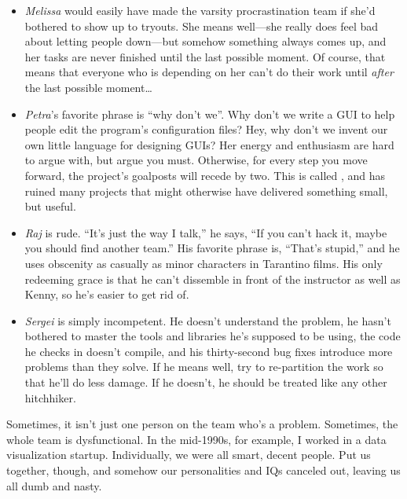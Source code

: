 \documentclass{report}
\begin{document}
\begin{itemize}
  \item \emph{Melissa} would easily have made the varsity
  procrastination team if she'd bothered to show up to tryouts.  She
  means well---she really does feel bad about letting people
  down---but somehow something always comes up, and her tasks are
  never finished until the last possible moment.  Of course, that
  means that everyone who is depending on her can't do their work
  until \emph{after} the last possible moment{\ldots}

  \item \emph{Petra}'s favorite phrase is ``why don't we''.  Why don't
  we write a GUI to help people edit the program's configuration
  files?  Hey, why don't we invent our own little language for
  designing GUIs?  Her energy and enthusiasm are hard to argue with,
  but argue you must.  Otherwise, for every step you move forward, the
  project's goalposts will recede by two.  This is called
  , and has ruined many projects that might
  otherwise have delivered something small, but useful.

  \item \emph{Raj} is rude.  ``It's just the way I talk,'' he says,
  ``If you can't hack it, maybe you should find another team.''  His
  favorite phrase is, ``That's stupid,'' and he uses obscenity as
  casually as minor characters in Tarantino films.  His only redeeming
  grace is that he can't dissemble in front of the instructor as well
  as Kenny, so he's easier to get rid of.

  \item \emph{Sergei} is simply incompetent.  He doesn't understand
  the problem, he hasn't bothered to master the tools and libraries
  he's supposed to be using, the code he checks in doesn't compile,
  and his thirty-second bug fixes introduce more problems than they
  solve.  If he means well, try to re-partition the work so that he'll
  do less damage.  If he doesn't, he should be treated like any other
  hitchhiker.

\end{itemize}


Sometimes, it isn't just one person on the team who's a problem.
Sometimes, the whole team is dysfunctional.  In the mid-1990s, for
example, I worked in a data visualization startup.  Individually, we
were all smart, decent people.  Put us together, though, and somehow
our personalities and IQs canceled out, leaving us all dumb and nasty.
\end{document}

